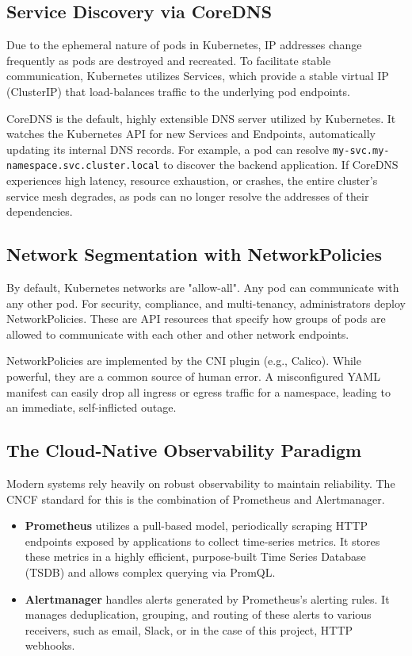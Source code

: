 \documentclass[12pt,a4paper]{article}
\begin{document}
\subsection{Service Discovery via CoreDNS}
Due to the ephemeral nature of pods in Kubernetes, IP addresses change frequently as pods are destroyed and recreated. To facilitate stable communication, Kubernetes utilizes Services, which provide a stable virtual IP (ClusterIP) that load-balances traffic to the underlying pod endpoints. 

CoreDNS is the default, highly extensible DNS server utilized by Kubernetes. It watches the Kubernetes API for new Services and Endpoints, automatically updating its internal DNS records. For example, a pod can resolve \texttt{my-svc.my-namespace.svc.cluster.local} to discover the backend application. If CoreDNS experiences high latency, resource exhaustion, or crashes, the entire cluster's service mesh degrades, as pods can no longer resolve the addresses of their dependencies.

\subsection{Network Segmentation with NetworkPolicies}
By default, Kubernetes networks are "allow-all". Any pod can communicate with any other pod. For security, compliance, and multi-tenancy, administrators deploy NetworkPolicies. These are API resources that specify how groups of pods are allowed to communicate with each other and other network endpoints. 

NetworkPolicies are implemented by the CNI plugin (e.g., Calico). While powerful, they are a common source of human error. A misconfigured YAML manifest can easily drop all ingress or egress traffic for a namespace, leading to an immediate, self-inflicted outage.

\subsection{The Cloud-Native Observability Paradigm}
Modern systems rely heavily on robust observability to maintain reliability. The CNCF standard for this is the combination of Prometheus and Alertmanager.
\begin{itemize}
    \item \textbf{Prometheus} utilizes a pull-based model, periodically scraping HTTP endpoints exposed by applications to collect time-series metrics. It stores these metrics in a highly efficient, purpose-built Time Series Database (TSDB) and allows complex querying via PromQL.
    \item \textbf{Alertmanager} handles alerts generated by Prometheus's alerting rules. It manages deduplication, grouping, and routing of these alerts to various receivers, such as email, Slack, or in the case of this project, HTTP webhooks.
\end{itemize}
\end{document}
